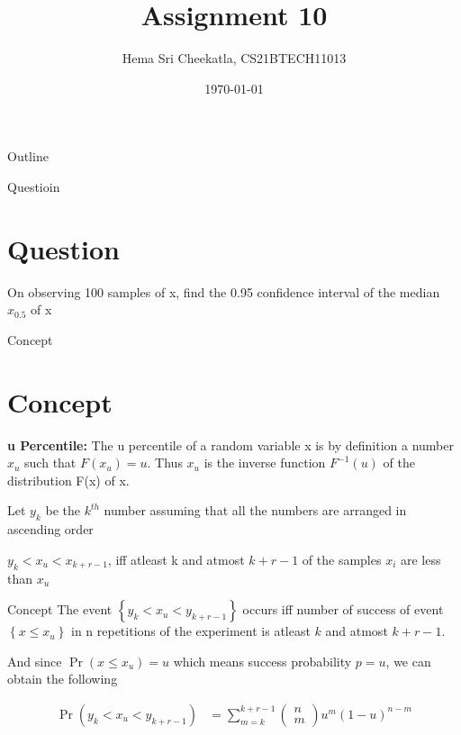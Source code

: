 \documentclass{beamer}
\title{Assignment 10}
\author{Hema Sri Cheekatla, CS21BTECH11013}
\date{\today}
\providecommand{\pr}[1]{\ensuremath{\Pr\left(#1\right)}}
\providecommand{\cbrak}[1]{\ensuremath{\left\{#1\right\}}}
\theoremstyle{remark}
\newcommand{\myvec}[1]{\ensuremath{\begin{pmatrix}#1\end{pmatrix}}}
\numberwithin{equation}{subsection}
\begin{document}
\begin{frame}
    \titlepage 
\end{frame}

\logo{}


\begin{frame}{Outline}
    \tableofcontents
\end{frame}

\begin{frame}{Questioin}
\section{Question}
    On observing 100 samples of x, find the 0.95 confidence interval of the median $x_{0.5}$ of x
\end{frame}

\begin{frame}{Concept}

\section{Concept}
 \textbf{u Percentile:}\newline
    The u percentile of a random variable x is by definition a number $x_u$
such that $F(x_u) = u$. Thus $x_u$ is the inverse function $F^{-1}(u)$ of the distribution F(x)
of x.\newline

Let $y_k$ be the $k^{th}$ number assuming that all the numbers are arranged in ascending order\newline

$y_k < x_u < x_{k+r-1}$, iff atleast k and atmost $k+r-1$ of the samples $x_i$ are less than $x_u$

\end{frame}

\begin{frame}{Concept}
    The event $\cbrak{y_k < x_u < y_{k+r-1}}$ occurs iff number of success of event $\cbrak{x \leq x_u}$ in n repetitions of the experiment is atleast $k$ and atmost $k+r-1$.\newline

    And since $\pr{x \leq x_u} = u$ which means success probability $p=u$, we can obtain the following
    
    \begin{align}
        \pr{y_k < x_u < y_{k+r-1}} &= \sum_{m=k}^{k+r-1} \myvec{n \\ m} u^m (1-u)^{n-m} 
    \end{align}

\end{frame}
\end{document}
